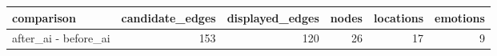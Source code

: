 \begin{tabular}{lrrrrr}
\toprule
comparison & candidate\_edges & displayed\_edges & nodes & locations & emotions \\
\midrule
after\_ai - before\_ai & 153 & 120 & 26 & 17 & 9 \\
\bottomrule
\end{tabular}
